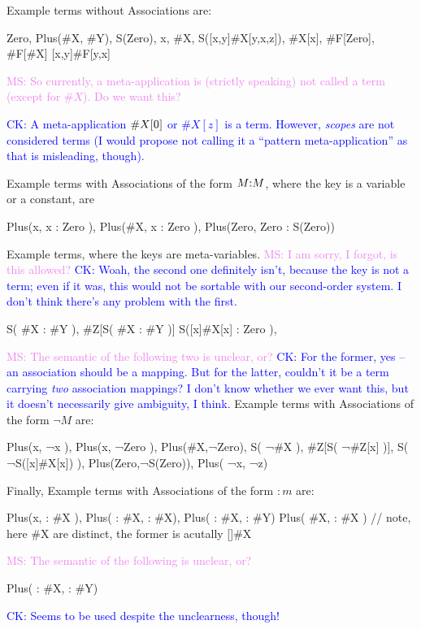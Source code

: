 \documentclass[letterpaper,11pt]{article}
\newcommand{\CK}[1]{\textcolor{blue}{CK: #1}}
\newcommand{\MS}[1]{\textcolor{violet}{MS: #1}}
\begin{document}
\begin{example}
  Example terms without Associations are: 
  \begin{hacs}[numbers=right, texcl]
      Zero, Plus(#X, #Y), S(Zero), x, #X, S([x,y]#X[y,x,z]), #X[x], #F[Zero], #F[#X]
      [x,y]#F[y,x]
    \end{hacs}
    \MS{So currently, a meta-application is (strictly speaking) not called a term (except for
      $\#X$). Do we want this?}

    \CK{A meta-application $\#X[\kw{0}]$ or $\#X[z]$ is a term.  However,
    \emph{scopes} are not considered terms (I would propose not calling it
    a ``pattern meta-application'' as that is misleading, though).}
    
    Example terms with Associations of the form $M \kw{:} M$, where the key is a variable or a
    constant, are
    \begin{hacs}[numbers=right,texcl]
      Plus(x, { x : Zero }), Plus(#X, { x : Zero }), Plus(Zero, {Zero : S(Zero)}) 
    \end{hacs}
    
    Example terms, where the keys are meta-variables. \MS{I am sorry, I forgot, is this allowed?}
    \CK{Woah, the second one definitely isn't, because the key is not a term;
    even if it was, this would not be sortable with our second-order system.
    I don't think there's any problem with the first.}
    \begin{hacs}[numbers=right,texcl]
     S({ #X : #Y }), #Z[S({ #X : #Y })]                    
     S({[x]#X[x] : Zero }), 
   \end{hacs}

   \MS{The semantic of the following two is unclear, or?}
   \CK{For the former, yes -- an association should be a mapping.  But for the
   latter, couldn't it be a term carrying \emph{two} association mappings?  I
   don't know whether we ever want this, but it doesn't necessarily give
   ambiguity, I think.}
   Example terms with Associations of the form $¬M$ are:
   \begin{hacs}[numbers=right,texcl]
     Plus(x, { ¬x }), Plus(x, { ¬Zero }), Plus(#X,{¬Zero}), S({ ¬#X }), 
     #Z[S({ ¬#Z[x] })], S({ ¬S([x]#X[x]) }), Plus(Zero,{¬S(Zero)}), Plus({ ¬x}, { ¬z})
   \end{hacs}
   
   Finally, Example terms with Associations of the form $: m$ are:
   \begin{hacs}[numbers=right,texcl]
     Plus(x, { : #X }), Plus( { : #X}, { : #X}), Plus( { : #X}, { : #Y})
     Plus( #X, { : #X })  // note, here \#X are distinct, the former is acutally []\#X
   \end{hacs}
   
  \MS{The semantic of the following is unclear, or?}
  \begin{hacs}[numbers=right,texcl]
    Plus( { : #X, : #Y})
  \end{hacs}
  \CK{Seems to be used despite the unclearness, though!}
\end{example}  
\end{document}
